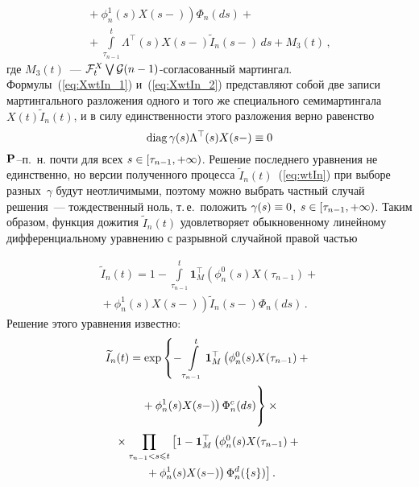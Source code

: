 \begin{multicols}{2}
{   \noindent
\begin{multline}
\left.   {}+\phi^1_{n}(s)X(s-)
 \right) \Phi_{n}(ds)+{} \\
 {}+ \int\limits_{\tau_{n-1}}^{t} \Lambda^{\top}(s)X(s-)\widetilde{I}_n(s-)\, ds+M_3(t)\,,
 \label{eq:XwtIn_2}
 \end{multline}
 где $M_3(t)$~--- ${\mathcal F}_t^X \bigvee {\mathcal G}(n-1)$-со\-гла\-со\-ван\-ный
 мартингал. Формулы~(\ref{eq:XwtIn_1}) и~(\ref{eq:XwtIn_2}) представляют
 собой две записи мартингального разложения одного и того же специального
 семимартингала $X(t)\widetilde{I}_n(t)$, и в силу единственности этого
 разложения верно равенство
 $$
 \mathop{\mathrm{diag}} \gamma(s) \Lambda^{\top}(s)X(s-) \equiv 0
 $$
 ${\mathbf P}$--п.~н. почти для всех $s \hm\in [\tau_{n-1},+\infty)$.
 Решение последнего уравнения не единственно, но версии полученного
 процесса $\widetilde{I}_n(t)$~(\ref{eq:wtIn}) при выборе разных~$\gamma$
 будут неотличимыми, поэтому можно выбрать частный случай решения~---
 тождественный ноль, т.\,е.\ положить $\gamma(s)\hm \equiv 0$, $s \hm
 \in [\tau_{n-1},+\infty)$. Таким образом, функция дожития
 $\widetilde{I}_n(t)$ удовлетворяет обыкновенному линейному
 дифференциальному уравнению с разрывной случайной правой частью

 \noindent
 \begin{multline}
 \widetilde{I}_n(t) = 1 - \int\limits_{\tau_{n-1}}^{t}\mathbf{1}_M^{\top}
 \left(\phi^0_{n}(s)X(\tau_{n-1})+{}\right.\\
\left. {}+\phi^1_{n}(s)X(s-)
 \right) \widetilde{I}_n(s-) \Phi_{n}(ds)\,.
 \label{eq:wtIn_2}
 \end{multline}
 Решение этого уравнения известно:
 \begin{multline}
 \widetilde{I}_n(t) = \exp \left\{
 -\int\limits_{\tau_{n-1}}^t \mathbf{1}_M^{\top}\left(
 \phi^0_n(s)X(\tau_{n-1})+{}\right.\right.\\
\left.\left. {}+\phi^1_n(s)X(s-)
 \right)\Phi^c_n(ds)
 \vphantom{\int\limits_{\tau_{n-1}}^t}
 \right\} \times{} \\
{} \times \prod\limits_{\tau_{n-1} < s \leqslant t}\left[
 1-
 \mathbf{1}_M^{\top}\left(
 \phi^0_n(s)X(\tau_{n-1})+{}\right.\right.\\
\left.\left. {}+\phi^1_n(s)X(s-)
 \right)\Phi^d_n(\{s\})
 \right].
 \label{eq:wtIn_3}
 \end{multline}

}
\end{multicols}
